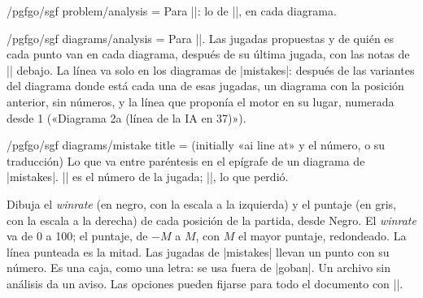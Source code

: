 \begin{key}{/pgfgo/sgf problem/analysis = }
	Para |\sgfproblem|: lo de |\sgf|, en cada diagrama.
\end{key}

\begin{key}{/pgfgo/sgf diagrams/analysis = }
	Para |\sgfdiagrams|. Las jugadas propuestas y de quién es cada punto van en cada diagrama, después de su última jugada, con las notas de |\pgfgocandidates| debajo. La línea va solo en los diagramas de |mistakes|: después de las variantes del diagrama donde está cada una de esas jugadas, un diagrama con la posición anterior, sin números, y la línea que proponía el motor en su lugar, numerada desde 1 («Diagrama 2a (línea de la IA en 37)»).

	\begin{codeexample}
	\end{codeexample}

\end{key}

\begin{key}{/pgfgo/sgf diagrams/mistake title =  (initially «ai line at» y el número, o su traducción)}
	Lo que va entre paréntesis en el epígrafe de un diagrama de |mistakes|. |\pgfgovariationmove| es el número de la jugada; |\pgfgoloss|, lo que perdió.

	\begin{codeexample}
	\end{codeexample}
\end{key}

\begin{command}{\sgfgraph{}}
	Dibuja el \emph{winrate} (en negro, con la escala a la izquierda) y el puntaje (en gris, con la escala a la derecha) de cada posición de la partida, desde Negro. El \emph{winrate} va de 0 a 100; el puntaje, de $-M$ a $M$, con $M$ el mayor puntaje, redondeado. La línea punteada es la mitad. Las jugadas de |mistakes| llevan un punto con su número. Es una caja, como una letra: se usa fuera de |goban|. Un archivo sin análisis da un aviso. Las opciones pueden fijarse para todo el documento con ||.

	\begin{codeexample}[]
	\end{codeexample}
\end{command}

